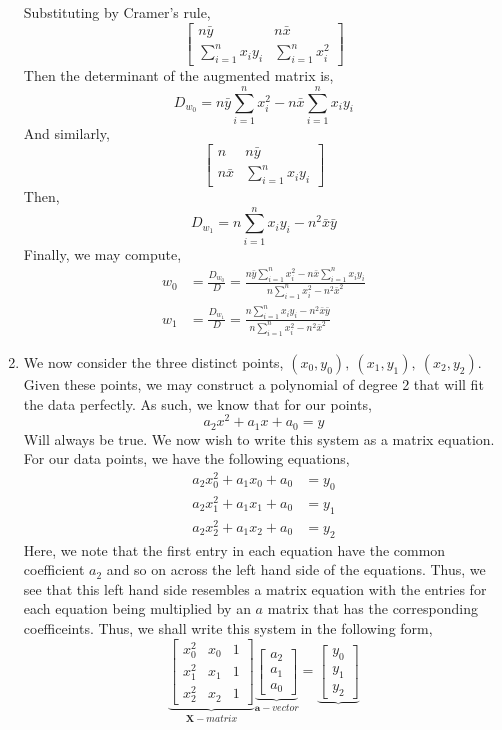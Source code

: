 \documentclass[letterpaper,10pt]{article}
\newcommand{\sxy}{\sum_{i=1}^nx_iy_i}
\begin{document}
\begin{enumerate}
Substituting by Cramer's rule,
\[\begin{bmatrix}
n\bar{y} & n\bar{x} \\
\sxy & \sum_{i=1}^n x_i^2
\end{bmatrix}\]
Then the determinant of the augmented matrix is,
\[D_{w_0}=n\bar{y}\sum_{i=1}^n x_i^2-n\bar{x}\sxy\]
And similarly,
\[\begin{bmatrix}
n & n\bar{y} \\
n\bar{x} & \sxy
\end{bmatrix}\]
Then,
\[D_{w_1}=n\sxy -n^2\bar{x}\bar{y}\]
Finally, we may compute,
\begin{align*}
w_0 &= \frac{D_{w_0}}{D}=\frac{n\bar{y}\sum_{i=1}^n x_i^2-n\bar{x}\sxy}{n\sum_{i=1}^n x_i^2-n^2\bar{x}^2}\\
w_1 &= \frac{D_{w_1}}{D}=\frac{n\sxy -n^2\bar{x}\bar{y}}{n\sum_{i=1}^n x_i^2-n^2\bar{x}^2}
\end{align*}
\item We now consider the three distinct points, $(x_0,y_0),\ (x_1,y_1),\ (x_2,y_2)$. Given these points, we may construct a polynomial of degree 2 that will fit the data perfectly. As such, we know that for our points,
\[a_2x^2+a_1x+a_0=y\]
Will always be true. We now wish to write this system as a matrix equation. For our data points, we have the following equations,
\begin{align*}
a_2x_0^2 + a_1x_0+a_0 &= y_0\\
a_2x_1^2 + a_1x_1+a_0 &= y_1\\
a_2x_2^2 +a_1x_2 +a_0 &= y_2
\end{align*}
Here, we note that the first entry in each equation have the common coefficient $a_2$ and so on across the left hand side of the equations. Thus, we see that this left hand side resembles a matrix equation with the entries for each equation being multiplied by an $a$ matrix that has the corresponding coefficeints. Thus, we shall write this system in the following form,
\[\underbrace{\begin{bmatrix}
x_0^2 & x_0 & 1\\
x_1^2 & x_1 & 1\\
x_2^2 & x_2 & 1
\end{bmatrix}}_{\textbf{X}-matrix}\underbrace{\begin{bmatrix}
a_2\\a_1\\a_0
\end{bmatrix}}_{\textbf{a}-vector}=\underbrace{\begin{bmatrix}
y_0\\y_1\\y_2

\end{bmatrix}}\]
\end{enumerate}
\end{document}
